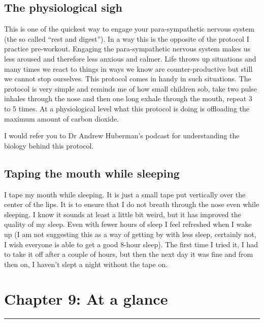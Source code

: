 \documentclass[
  oneside]{book}
\begin{document}
\hypertarget{the-physiological-sigh}{%
\subsection{The physiological sigh}\label{the-physiological-sigh}}

This is one of the quickest way to engage your para-sympathetic nervous system (the so called ``rest and digest''). In a way this is the opposite of the protocol I practice pre-workout. Engaging the para-sympathetic nervous system makes us less aroused and therefore less anxious and calmer. Life throws up situations and many times we react to things in ways we know are counter-productive but still we cannot stop ourselves. This protocol comes in handy in such situations. The protocol is very simple and reminds me of how small children sob, take two pulse inhales through the nose and then one long exhale through the mouth, repeat 3 to 5 times. At a physiological level what this protocol is doing is offloading the maximum amount of carbon dioxide.

I would refer you to Dr Andrew Huberman's podcast for understanding the biology behind this protocol.

\hypertarget{taping-the-mouth-while-sleeping}{%
\subsection{Taping the mouth while sleeping}\label{taping-the-mouth-while-sleeping}}

I tape my mouth while sleeping. It is just a small tape put vertically over the center of the lips. It is to ensure that I do not breath through the nose even while sleeping. I know it sounds at least a little bit weird, but it has improved the quality of my sleep. Even with fewer hours of sleep I feel refreshed when I wake up (I am not suggesting this as a way of getting by with less sleep, certainly not, I wish everyone is able to get a good 8-hour sleep). The first time I tried it, I had to take it off after a couple of hours, but then the next day it was fine and from then on, I haven't slept a night without the tape on.

\hypertarget{chapter-9-at-a-glance}{%
\section{Chapter 9: At a glance}\label{chapter-9-at-a-glance}}

\begin{center}\rule{0.5\linewidth}{0.5pt}\end{center}
\end{document}
